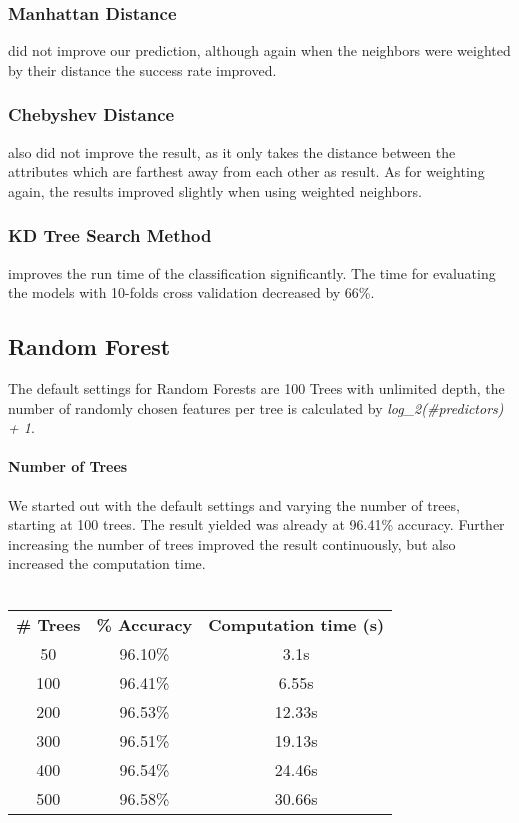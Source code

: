 \documentclass{sig-alternate-05-2015}
\begin{document}
\subsubsection{Manhattan Distance} did not improve our prediction, although again when the neighbors were weighted by their distance the success rate improved.
\subsubsection{Chebyshev Distance} also did not improve the result, as it only takes the distance between the attributes which are farthest away from each other as result. As for weighting again, the results improved slightly when using weighted neighbors.
\subsubsection{KD Tree Search Method} improves the run time of the classification significantly. The time for evaluating the models with 10-folds cross validation decreased by 66\%. 

\subsection{Random Forest}
The default settings for Random Forests are 100 Trees with unlimited depth, the number of randomly chosen features per tree is calculated by \textit{log\_2(\#predictors) + 1}.
\paragraph{Number of Trees} We started out with the default settings and varying the number of trees, starting at 100 trees. The result yielded was already at 96.41\% accuracy. Further increasing the number of trees improved the result continuously, but also increased the computation time. 
\\\\
\begin{tabular}{ c | c | c }
\textbf{\# Trees} & \textbf{\% Accuracy} & \textbf{Computation time (s)} \\
50 & 96.10\% & 3.1s \\
100 & 96.41\% & 6.55s \\
200 & 96.53\% & 12.33s \\
300 & 96.51\% & 19.13s \\
400 & 96.54\% & 24.46s \\
500 & 96.58\% & 30.66s\\
\end{tabular}
\end{document}
